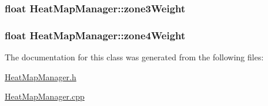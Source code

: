 \hypertarget{class_heat_map_manager_aefbd0636746ab18ae5d305e4b3268ace}{
\subsubsection[{zone3\-Weight}]{\setlength{\rightskip}{0pt plus 5cm}float Heat\-Map\-Manager\-::zone3\-Weight\hspace{0.3cm}{\ttfamily [private]}}}\label{class_heat_map_manager_aefbd0636746ab18ae5d305e4b3268ace}
\hypertarget{class_heat_map_manager_a627d9bb3ce50a7473fdf84d9a048da9d}{
\subsubsection[{zone4\-Weight}]{\setlength{\rightskip}{0pt plus 5cm}float Heat\-Map\-Manager\-::zone4\-Weight\hspace{0.3cm}{\ttfamily [private]}}}\label{class_heat_map_manager_a627d9bb3ce50a7473fdf84d9a048da9d}


The documentation for this class was generated from the following files\-:\begin{DoxyCompactItemize}
\item 
\hyperlink{_heat_map_manager_8h}{Heat\-Map\-Manager.\-h}\item 
\hyperlink{_heat_map_manager_8cpp}{Heat\-Map\-Manager.\-cpp}\end{DoxyCompactItemize}
